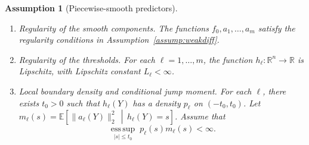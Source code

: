 \documentclass[12pt]{article}
\newtheorem{assumption}{Assumption}[section]
\theoremstyle{general}
\begin{document}

\begin{assumption}[Piecewise-smooth predictors]
\label{ass:beyond smooth}
\begin{enumerate}[label=(\roman*)]
\item\label{ass:piecewise:regular} \textit{Regularity of the smooth components.}
The functions $f_0,a_1,\ldots,a_m$ satisfy the regularity conditions in Assumption~\ref{assump:weakdiff}.

\item \textit{Regularity of the thresholds.}
For each \(\ell=1,\ldots,m\), the function
\(h_\ell:\mathbb R^n\to\mathbb R\) is Lipschitz, with Lipschitz
constant \(L_\ell<\infty\).

\item \textit{Local boundary density and conditional jump moment.}
For each \(\ell\), there exists \(t_0>0\) such that \(h_\ell(Y)\) has a density
\(p_\ell\) on \((-t_0,t_0)\). Let
$
m_\ell(s)
=
\mathbb E\!\left[
\|a_\ell(Y)\|_2^2
\,\middle|\,
h_\ell(Y)=s
\right]$.
Assume that
\begin{equation}
\label{eq:bounded-jump}
\operatorname*{ess\,sup}_{|s|\le t_0}\; p_\ell(s) m_\ell(s)
<\infty.
\end{equation}
\end{enumerate}
\end{assumption}
\end{document}
